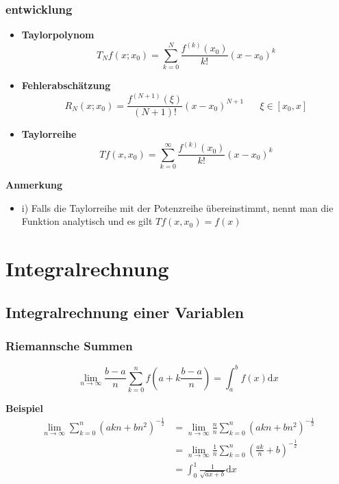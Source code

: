 \documentclass[8pt, a4paper, landscape, fleqn]{scrartcl}
\newenvironment {example}
				{\begin{itshape} \begin{small}}
				{\end{small} \end{itshape}}
\newenvironment {annotation}[1]
				{\begin{itshape} \begin{small} \textbf{#1} \begin{itemize}}
				{\end{itemize} \end{small} \end{itshape}}
\begin{document}
\begin{multicols*}{3}
				\subsubsection{entwicklung}
					\begin{itemize}
						\item \textbf{Taylorpolynom}
						\begin{equation*}
							T_Nf(x; x_0)=\sum_{k=0}^{N}\frac{f^{(k)}(x_0)}{k!}(x-x_0)^k
						\end{equation*}
						\item \textbf{Fehlerabschätzung}
						\begin{equation*}
							R_N(x;x_0)=\frac{f^{(N+1)}(\xi)}{(N+1)!}(x-x_0)^{N+1} \hspace{20pt} \xi \in [x_0, x]
						\end{equation*}
						\item \textbf{Taylorreihe}
						\begin{equation*}
							Tf(x, x_0)=\sum_{k=0}^{\infty} \frac{f^{(k)}(x_0)}{k!}(x-x_0)^k
						\end{equation*}
					\end{itemize}
					\begin{annotation}{Anmerkung}
						\item[i)] Falls die Taylorreihe mit der Potenzreihe übereinstimmt, nennt man die Funktion analytisch und es gilt $Tf(x, x_0)=f(x)$
					\end{annotation}
			
		\section{Integralrechnung}
			\subsection{Integralrechnung einer Variablen}
				\subsubsection{Riemannsche Summen}
					\begin{equation*}
						\lim_{n \rightarrow \infty} \frac{b-a}{n} \sum_{k=0}^{n}f\left(a+k\frac{b-a}{n}\right)=\int_{a}^{b}f(x) \text{d}x
					\end{equation*}
					\begin{example}
						\textbf{Beispiel}
						\begin{align*}
						\lim_{n \rightarrow \infty} \sum_{k=0}^{n} \left(akn+bn^2\right)^{-\frac{1}{2}}&=\lim_{n \rightarrow \infty} \frac{n}{n} \sum_{k=0}^{n} \left(akn+bn^2\right)^{-\frac{1}{2}}\\
						&=\lim_{n \rightarrow \infty} \frac{1}{n} \sum_{k=0}^{n} \left(\frac{ak}{n}+b\right)^{-\frac{1}{2}}\\
						&=\int_{0}^{1}\frac{1}{\sqrt{ax+b}} \text{d}x
						\end{align*}
					\end{example}

\end{multicols*}
\end{document}
